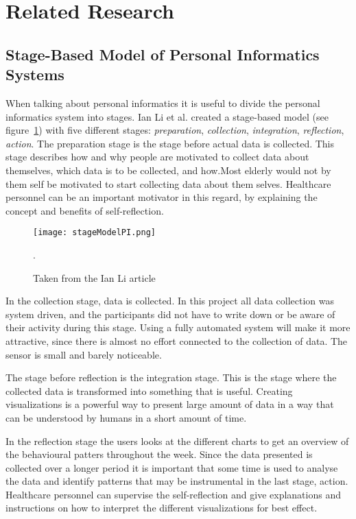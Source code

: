 \section{Related Research}

\subsection{Stage-Based Model of Personal Informatics Systems}
When talking about personal informatics it is useful to divide the personal informatics system into stages. Ian Li et al. created a stage-based model (see figure~\ref{fig:stageModelPI}) \cite{li2010} with five different stages: \emph{preparation}, \emph{collection}, \emph{integration}, \emph{reflection}, \emph{action}. The preparation stage is the stage before actual data is collected. This stage describes how and why people are motivated to collect data about themselves, which data is to be collected, and how.Most elderly would not by them self be motivated to start collecting data about them selves. Healthcare personnel can be an important motivator in this regard, by explaining the concept and benefits of self-reflection. 

\begin{figure}[h!]
	\centering
		\texttt{[image: stageModelPI.png]}
		\caption{\footnotesize Taken from the Ian Li article \cite{li2010}}.
		\label{fig:stageModelPI}
\end{figure}

In the collection stage, data is collected. In this project all data collection was system driven, and the participants did not have to write down or be aware of their activity during this stage. Using a fully automated system will make it more attractive, since there is almost no effort connected to the collection of data. The sensor is small and barely noticeable.

The stage before reflection is the integration stage. This is the stage where the collected data is transformed into something that is useful. Creating visualizations is a powerful way to present large amount of data in a way that can be understood by humans in a short amount of time. 

In the reflection stage the users looks at the different charts to get an overview of the behavioural patters throughout the week. Since the data presented is collected over a longer period it is important that some time is used to analyse the data and identify patterns that may be instrumental in the last stage, action. Healthcare personnel can supervise the self-reflection and give explanations and instructions on how to interpret the different visualizations for best effect.

